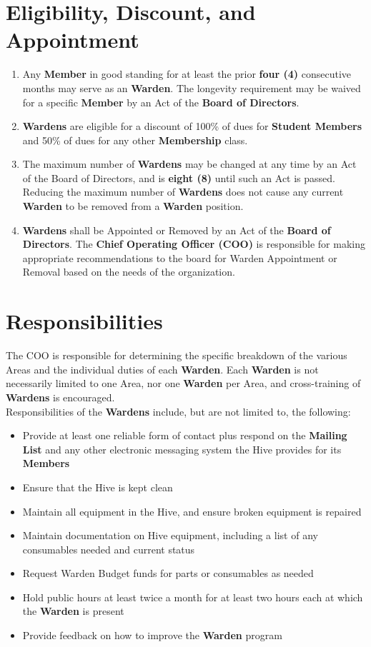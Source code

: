\documentclass[11pt, oneside]{article}   	%
\begin{document}
\section{Eligibility, Discount, and Appointment}
\begin{enumerate}
	\item Any \textbf{Member} in good standing for at least the prior \textbf{four (4)} consecutive months may serve as an \textbf{Warden}.  The longevity requirement may be waived for a specific \textbf{Member} by an Act of the \textbf{Board of Directors}.
	\item \textbf{Wardens} are eligible for a discount of 100\% of dues for \textbf{Student Members} and 50\% of dues for any other \textbf{Membership} class.
	\item The maximum number of \textbf{Wardens} may be changed at any time by an Act of the Board of Directors, and is \textbf{eight (8)} until such an Act is passed.
Reducing the maximum number of \textbf{Wardens} does not cause any current \textbf{Warden} to be removed from a \textbf{Warden} position.
	\item \textbf{Wardens} shall be Appointed or Removed by an Act of the \textbf{Board of Directors}.  The \textbf{Chief Operating Officer (COO)} is responsible for making appropriate recommendations to the board for Warden Appointment or Removal based on the needs of the organization.
\end{enumerate}

\section{Responsibilities}
The COO is responsible for determining the specific breakdown of the various Areas and the individual duties of each \textbf{Warden}.
Each \textbf{Warden} is not necessarily limited to one Area, nor one \textbf{Warden} per Area, and cross-training of \textbf{Wardens} is encouraged.\\
Responsibilities of the \textbf{Wardens} include, but are not limited to, the following:
\begin{itemize}[noitemsep]
\item Provide at least one reliable form of contact plus respond on the \textbf{Mailing List} and any other electronic messaging system the Hive provides for its \textbf{Members}
\item Ensure that the Hive is kept clean
\item Maintain all equipment in the Hive, and ensure broken equipment is repaired
\item Maintain documentation on Hive equipment, including a list of any consumables needed and current status
\item Request Warden Budget funds for parts or consumables as needed
\item Hold public hours at least twice a month for at least two hours each at which the \textbf{Warden} is present
\item Provide feedback on how to improve the \textbf{Warden} program
\end{itemize}
\end{document}

